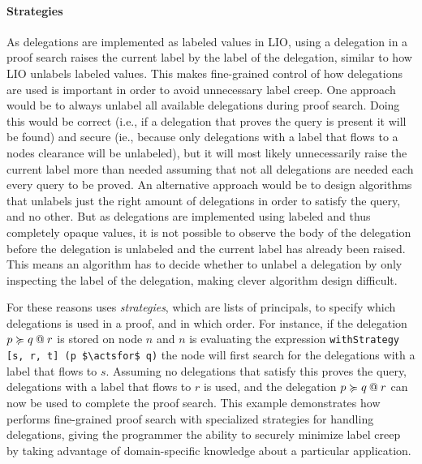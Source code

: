 \paragraph{Strategies}
As delegations are implemented as labeled values in LIO, using a delegation in a proof search raises the current label by the label of the delegation, similar to how LIO unlabels labeled values. This makes fine-grained control of how delegations are used is important in order to avoid unnecessary label creep.
One approach would be to always unlabel all available delegations during proof search. Doing this would be correct (i.e., if a delegation that proves the query is present it will be found) and secure (ie., because only delegations with a label that flows to a nodes clearance will be unlabeled), but it will most likely unnecessarily raise the current label more than needed assuming that not all delegations are needed each every query to be proved.
An alternative approach would be to design algorithms that unlabels just the right amount of delegations in order to satisfy the query, and no other. But as delegations are implemented using labeled and thus completely opaque values, it is not possible to observe the body of the delegation before the delegation is unlabeled and the current label has already been raised. This means an algorithm has to decide whether to unlabel a delegation by only inspecting the label of the delegation, making clever algorithm design difficult.

For these reasons \lang{} uses \emph{strategies}, which are lists of principals, to specify which delegations is used in a proof, and in which order. For instance, if the delegation $\lb{r}{p \actsfor q}$ is stored on node $n$ and $n$ is evaluating the expression \lstinline[mathescape]!withStrategy [s, r, t] (p $\actsfor$ q)! the node will first search for the delegations with a label that flows to $s$. Assuming no delegations that satisfy this proves the query, delegations with a label that flows to $r$ is used, and the delegation $\lb{r}{p \actsfor q}$ can now be used to complete the proof search. This example demonstrates how \lang{} performs fine-grained proof search with specialized strategies for handling delegations, giving the programmer the ability to securely minimize label creep by taking advantage of domain-specific knowledge about a particular application.


